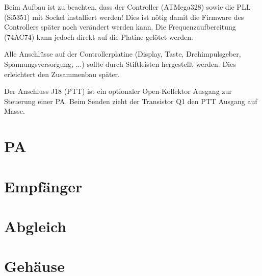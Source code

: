 \documentclass[10pt, a4paper]{paper}
\newcommand{\warn}[1]{{\color{red} #1}}
\begin{document}
Beim Aufbau ist zu beachten, \warn{dass der Controller (ATMega328) sowie die PLL (Si5351) mit Sockel installiert werden!} Dies ist nötig damit die Firmware des Controllers später noch verändert werden kann. Die Frequenzaufbereitung (74AC74) kann jedoch direkt auf die Platine gelötet werden. 

Alle Anschlüsse auf der Controllerplatine (Display, Taste, Drehimpulsgeber, Spannungsversorgung, ...) sollte durch Stiftleisten hergestellt werden. Dies erleichtert den Zusammenbau später.

Der Anschluss J18 (PTT) ist ein optionaler Open-Kollektor Ausgang zur Steuerung einer PA. Beim Senden zieht der Transistor Q1 den PTT Ausgang auf Masse.


\section{PA}

\section{Empfänger}

\section{Abgleich}

\section{Gehäuse}
\end{document}
